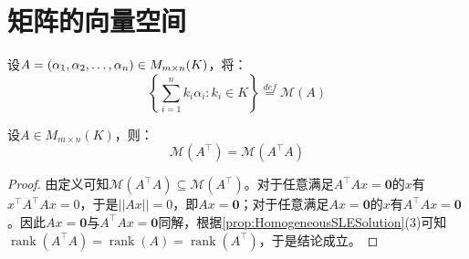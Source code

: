 \section{矩阵的向量空间}

\begin{definition}
	设$A=(\alpha_1, \alpha_2, \dots, \alpha_{n})\in M_{m\times n}(K)$，将：
	\begin{equation*}
		\left\{\sum_{i=1}^{n}k_i\alpha_i:k_i\in K\right\}\overset{def}{=}\mathcal{M}(A)
	\end{equation*}
\end{definition}
\begin{theorem}\label{theo:VectorSpaceAAAT}
	设$A\in M_{m\times n}(K)$，则：
	\begin{equation*}
		\mathcal{M}(A^{\top})=\mathcal{M}(A^{\top}A)
	\end{equation*}
\end{theorem}
\begin{proof}
	由定义可知$\mathcal{M}(A^{\top}A)\subseteq\mathcal{M}(A^{\top})$。对于任意满足$A^{\top}Ax=\mathbf{0}$的$x$有$x^{\top}A^{\top}Ax=0$，于是$||Ax||=0$，即$Ax=\mathbf{0}$；对于任意满足$Ax=\mathbf{0}$的$x$有$A^{\top}Ax=\mathbf{0}$。因此$Ax=\mathbf{0}$与$A^{\top}Ax=\mathbf{0}$同解，根据\cref{prop:HomogeneousSLESolution}(3)可知$\operatorname{rank}(A^{\top}A)=\operatorname{rank}(A)=\operatorname{rank}(A^{\top})$，于是结论成立。
\end{proof}